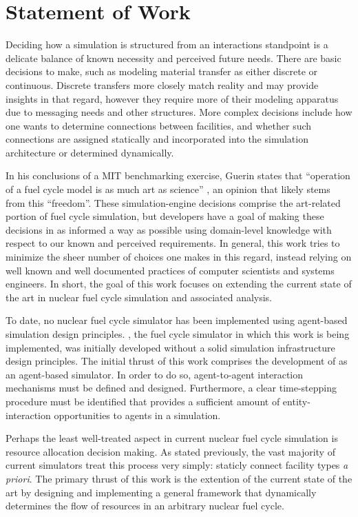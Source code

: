 
\section{Statement of Work}

Deciding how a simulation is structured from an interactions standpoint is a
delicate balance of known necessity and perceived future needs. There are basic
decisions to make, such as modeling material transfer as either discrete or
continuous. Discrete transfers more closely match reality and may provide
insights in that regard, however they require more of their modeling apparatus
due to messaging needs and other structures. More complex decisions include how
one wants to determine connections between facilities, and whether such
connections are assigned statically and incorporated into the simulation
architecture or determined dynamically.

In his conclusions of a MIT benchmarking exercise, Guerin states that
``operation of a fuel cycle model is as much art as science''
\cite{guerin_benchmark_2009}, an opinion that likely stems from this
``freedom''. These simulation-engine decisions comprise the art-related portion
of fuel cycle simulation, but developers have a goal of making these decisions
in as informed a way as possible using domain-level knowledge with respect to
our known and perceived requirements. In general, this work tries to minimize
the sheer number of choices one makes in this regard, instead relying on well
known and well documented practices of computer scientists and systems
engineers. In short, the goal of this work focuses on extending the current
state of the art in nuclear fuel cycle simulation and associated analysis.

To date, no nuclear fuel cycle simulator has been implemented using agent-based
simulation design principles. \Cyclus, the fuel cycle simulator in which this
work is being implemented, was initially developed without a solid simulation
infrastructure design principles. The initial thrust of this work comprises the
development of \Cyclus as an agent-based simulator. In order to do so,
agent-to-agent interaction mechanisms must be defined and designed. Furthermore,
a clear time-stepping procedure must be identified that provides a sufficient
amount of entity-interaction opportunities to agents in a simulation. 

Perhaps the least well-treated aspect in current nuclear fuel cycle simulation
is resource allocation decision making. As stated previously, the vast majority
of current simulators treat this process very simply: staticly connect facility
types \textit{a priori}. The primary thrust of this work is the extention of the
current state of the art by designing and implementing a general framework that
dynamically determines the flow of resources in an arbitrary nuclear fuel cycle. 

